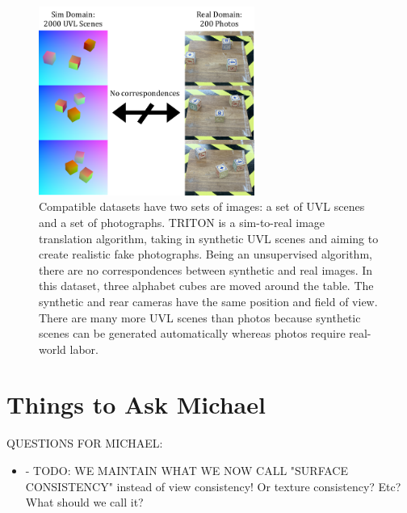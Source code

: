 \documentclass{article}
\begin{document}
\begin{figure}[H]
	\begin{center}
		\includegraphics[width=200pt]{../images/dataset_explanation.pdf}
	\end{center}
	\caption{
		Compatible datasets have two sets of images: a set of UVL scenes and a set of photographs.
		TRITON is a sim-to-real image translation algorithm, taking in synthetic UVL scenes and aiming to create realistic fake photographs. 
		Being an unsupervised algorithm, there are no correspondences between synthetic and real images.
		In this dataset, three alphabet cubes are moved around the table. 
		The synthetic and rear cameras have the same position and field of view.
		There are many more UVL scenes than photos because synthetic scenes can be generated automatically whereas photos require real-world labor.
		}
	\label{fig:dataset_explanation}
\end{figure}


\section*{Things to Ask Michael}


QUESTIONS FOR MICHAEL:
\begin{itemize}
	\item - TODO: WE MAINTAIN WHAT WE NOW CALL "SURFACE CONSISTENCY" instead of view consistency! Or texture consistency? Etc? What should we call it?
\end{itemize}
\end{document}
